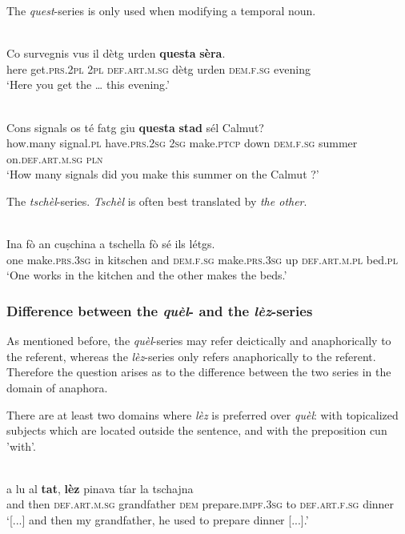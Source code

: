 {The \textit{quest}-series is only used when modifying a temporal noun.

\ea\label{}
\\
\gll Co survegnis vus il dètg urden \textbf{questa} \textbf{sèra}.\\
  here get.\textsc{prs.2pl} \textsc{2pl} \textsc{def.art.m.sg} dètg urden \textsc{dem.f.sg} evening\\
\glt `Here you get the … this evening.'
\z

\ea\label{}
\\
\gll    Cons signals os té fatg giu \textbf{questa} \textbf{stad} sél Calmut?\\
  how.many signal.\textsc{pl} have.\textsc{prs.2sg} \textsc{2sg} make.\textsc{ptcp} down \textsc{dem.f.sg} summer on.\textsc{def.art.m.sg} \textsc{pln}\\
\glt `How many signals did you make this summer on the Calmut ?'
\z

The \textit{tschèl}-series.
\textit{Tschèl} is often best translated by \textit{the other}.

\ea\label{}
\\
\gll Ina fò an cuṣchina a tschella fò sé ils létgs.\\
  one make.\textsc{prs.3sg} in kitschen and \textsc{dem.f.sg} make.\textsc{prs.3sg} up \textsc{def.art.m.pl} bed.\textsc{pl}\\
\glt `One works in the kitchen and the other makes the beds.'
\z

\subsubsection{Difference between the \textit{quèl}- and the \textit{lèz}-series}
As mentioned before, the \textit{quèl}-series may refer deictically and anaphorically to the referent, whereas the \textit{lèz}-series only refers anaphorically to the referent. Therefore the question arises as to the difference between the two series in the domain of anaphora.

There are at least two domains where \textit{lèz} is preferred over \textit{quèl}: with topicalized subjects which are located outside the sentence, and with the preposition cun 'with'.  

\ea\label{}
\\
\gll a lu al \textbf{tat}, \textbf{lèz} pinava tíar la tschajna  \\
  and then \textsc{def.art.m.sg} grandfather \textsc{dem} prepare.\textsc{impf.3sg} to \textsc{def.art.f.sg} dinner  \\
\glt `[...] and then my grandfather, he used to prepare dinner [...].'
\z

}
